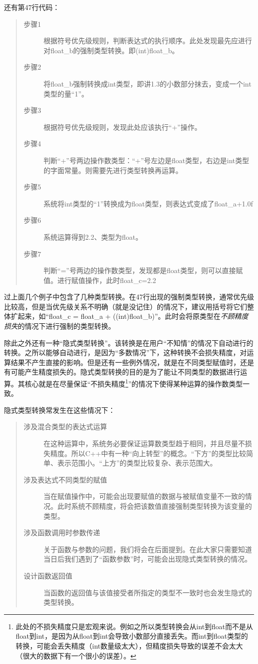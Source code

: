 还有第47行代码：
\begin{quote}
	\begin{description}
		\item[步骤1] 根据符号优先级规则，判断表达式的执行顺序。此处发现最先应进行对float\_b的强制类型转换。即(int)float\_b。
		\item[步骤2] 将float\_b强制转换成int类型，即讲1.3的小数部分抹去，变成一个int类型的量“1”。
		\item[步骤3] 根据符号优先级规则，发现此处应该执行“+”操作。
		\item[步骤4] 判断“+”号两边操作数类型：“+”号左边是float类型，右边是int类型的字面常量。则需要先进行类型转换再运算。
		\item[步骤5] 系统将int类型的“1”转换成为float类型，则表达式变成了float\_a+1.0f
		\item[步骤6] 系统运算得到2.2、类型为float。
		\item[步骤7] 判断“=”号两边的操作数类型，发现都是float类型，则可以直接赋值。进行赋值操作，此时float\_c=2.2
	\end{description}
\end{quote}

过上面几个例子中包含了几种类型转换。在47行出现的强制类型转换，通常优先级比较高，但是当优先级关系不明确（就是没记住）的情况下，建议用括号将它们整体扩起来，如“float\_c = float\_a + ((int)float\_b)”。此时会将原类型在\emph{不顾精度损失}的情况下进行强制的类型转换。

除此之外还有一种“隐式类型转换”。该转换是在用户“不知情”的情况下自动进行的转换。之所以能够自动进行，是因为“多数情况”下，这种转换不会损失精度，对运算结果不产生直接的影响。但是还有一些例外情况，就是在不同类型赋值时，还是有可能产生精度损失的。隐式类型转换的目的是为了能让不同类型的数据进行运算。其核心就是在尽量保证“不损失精度\footnote{此处的不损失精度只是宏观来说。例如之所以类型转换会从int到float而不是从float到int，是因为从float到int会导致小数部分直接丢失。而int到float类型的转换，可能会丢失精度（int数量级太大），但精度损失导致的误差不会太大（很大的数据下有一个很小的误差）。}”的情况下使得某种运算的操作数类型一致。

隐式类型转换常发生在这些情况下：
\begin{quote}
	\begin{description}
		\item[涉及混合类型的表达式运算] 在这种运算中，系统务必要保证运算数类型趋于相同，并且尽量不损失精度。所以C++中有一种“向上转型”的概念。“下方”的类型比较简单、表示范围小。“上方”的类型比较复杂、表示范围大。
		\item[涉及表达式不同类型的赋值] 当在赋值操作中，可能会出现要赋值的数据与被赋值变量不一致的情况。此时系统不顾精度，将会把该数值直接强制类型转换为该变量的类型。
		\item[涉及函数调用时参数传递] 关于函数与参数的问题，我们将会在后面提到。在此大家只需要知道当日后我们遇到了“函数参数”时，可能会出现隐式类型转换的情况。
		\item[设计函数返回值] 当函数的返回值与该值接受者所指定的类型不一致时也会发生隐式的类型转换。
	\end{description}
\end{quote}

